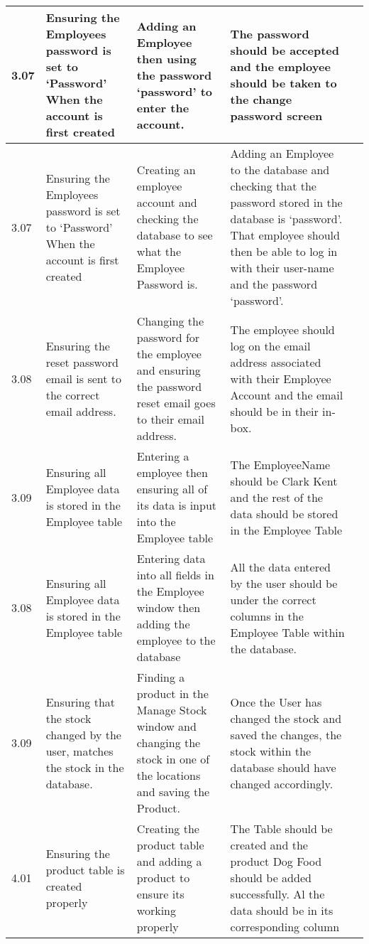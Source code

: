 \begin{flushleft}
\begin{longtable}{|p{1cm}|p{2.5cm}|p{2.5cm}|p{2cm}|p{2cm}|}
	\rowcolor{dark-grey}3.07 & Ensuring the Employees password is set to `Password' When the account is first created & Adding an Employee then using the password `password' to enter the account. & The password should be accepted and the employee should be taken to the change password screen& \\ \hline
	\rowcolor{light-grey}3.07 & Ensuring the Employees password is set to `Password' When the account is first created & Creating an employee account and checking the database to see what the Employee Password is. & Adding an Employee to the database and checking that the password stored in the database is `password'. That employee should then be able to log in with their user-name and the password `password'. & \\ \hline
	\rowcolor{dark-grey}3.08 & Ensuring the reset password email is sent to the correct email address. & Changing the password for the employee and ensuring the password reset email goes to their email address. & The employee should log on the email address associated with their Employee Account and the email should be in their in-box.& \\ \hline
	\rowcolor{dark-grey}3.09 & Ensuring all Employee data is stored in the Employee table & Entering a employee then ensuring all of its data is input into the Employee table & The EmployeeName should be Clark Kent and the rest of the data should be stored in the Employee Table & \\ \hline
	\rowcolor{light-grey}3.08 & Ensuring all Employee data is stored in the Employee table & Entering data into all fields in the Employee window then adding the employee to the database & All the data entered by the user should be under the correct columns in the Employee Table within the database. & \\ \hline
	\rowcolor{light-grey}3.09 & Ensuring that the stock changed by the user, matches the stock in the database. & Finding a product in the Manage Stock window and changing the stock in one of the locations and saving the Product. & Once the User has changed the stock and saved the changes, the stock within the database should have changed accordingly. & \\ \hline
	\rowcolor{dark-grey}4.01 & Ensuring the product table is created properly & Creating the product table and adding a product to ensure its working properly & The Table should be created and the product Dog Food should be added successfully. Al the data should be in its corresponding column & \\ \hline

\end{longtable}
\end{flushleft}
